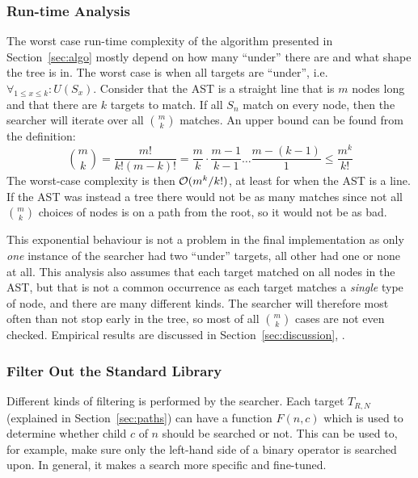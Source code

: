 \documentclass[a4paper,12pt]{article}
\begin{document}
\subsubsection{Run-time Analysis}\label{sec:algo:anal}
The worst case run-time complexity of the algorithm presented in Section~\ref{sec:algo}
mostly depend on how many ``under'' there are and what shape the
tree is in. The worst case is when all targets are ``under'', i.e.\@ $\forall_{1 \leq x
  \leq k} : U(S_x)$. Consider that the AST is a straight line that is $m$
nodes long and that there are $k$ targets to match. If all $S_n$ match on every node, then the
searcher will iterate over all $\binom{m}{k}$ matches. An upper bound can be found from the
definition:
\begin{equation*}
  \binom{m}{k} = \frac{m!}{k! (m-k)!} = \frac{m}{k} \cdot \frac{m-1}{k-1} \dots \frac{m -
    (k-1)}{1} \leq \frac{m^k}{k!}
\end{equation*}%
The worst-case complexity is then $\mathcal{O} ({m^k}/{k!})$, at least for when the AST is a line.
If the AST was instead a tree there would not be as many matches since not all
$\binom{m}{k}$ choices of nodes is on a path from the root, so it would not be as bad.

This exponential behaviour is not a problem in the final implementation as only \emph{one}
instance of the searcher had two ``under'' targets, all other had one or none at all.
This analysis also assumes that each target matched
on all nodes in the AST, but that is not a common occurrence as each target matches a
\emph{single} type of node, and there are many different kinds. The searcher will
therefore most often than not stop early in the tree, so most of all $\binom{m}{k}$ cases
are not even checked. Empirical results are discussed in Section~\ref{sec:discussion},
.

\subsubsection{Filter Out the Standard Library}\label{sec:filter:stdlib}
Different kinds of filtering is performed by the searcher. Each target $T_{R,N}$
(explained in Section~\ref{sec:paths}) can have a function $F(n,c)$ which is used to
determine whether child $c$ of $n$ should be searched or not. This can be used to, for
example, make sure only the left-hand side of a binary operator is searched upon. In
general, it makes a search more specific and fine-tuned.
\end{document}
